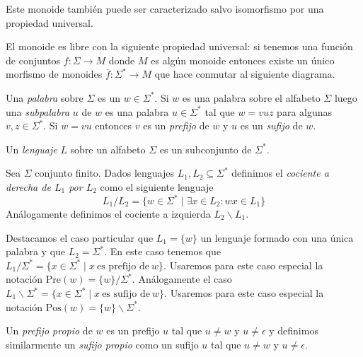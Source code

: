 \documentclass[tesis.tex]{subfiles}
\begin{document}
Este monoide también puede ser caracterizado salvo isomorfismo por una propiedad universal.

\begin{obs}
	El monoide es libre con la siguiente propiedad universal: si tenemos una función de conjuntos $f: \Sigma \to M$ donde $M$ es algún monoide entonces existe un único morfismo de monoides $\overline f: \Sigma^{*} \to M$ que hace conmutar al siguiente diagrama.	
	
	\begin{center}
	\end{center}
	
\end{obs}

Una \emph{palabra} sobre $\Sigma$ es un $w \in \Sigma^*$.
Si $w $ es una palabra sobre el alfabeto $\Sigma$ luego una \emph{subpalabra} $u$ de $w$ es una palabra $u \in \Sigma^*$ tal que $w = vuz$ para algunas $v, z \in \Sigma^*$. 
Si $w = vu$ entonces $v$ es un \emph{prefijo} de $w$ y $u$ es un \emph{sufijo} de $w$.


\begin{deff}
	Un \emph{lenguaje} $L$ sobre un alfabeto $\Sigma$ es un subconjunto de $\Sigma^*$.
\end{deff}

\begin{deff}
	Sea $\Sigma$ conjunto finito.
	Dados lenguajes $L_{1}, L_{2} \subseteq \Sigma^*$ definimos el \emph{cociente a derecha de $L_{1}$ por $L_{2}$} como el siguiente lenguaje
	\[
	L_{1}/L_{2} = \{ w \in \Sigma^* \mid \exists x \in L_{2}: wx \in L_{1}    \}
	\]
	Análogamente definimos el cociente a izquierda $L_{2} \backslash L_{1}$.
\end{deff}
Destacamos el caso particular que $L_{1} = \{w\}$ un lenguaje formado con una única palabra y que $L_{2} = \Sigma^*$.
En este caso tenemos que $L_{1}/\Sigma^* = \{  x \in \Sigma^*  \mid x \ \text{es prefijo de} \ w  \}$.
Usaremos para este caso especial la notación $ \textrm{Pre}(w) = \{w\}/\Sigma^*$.
Análogamente el caso $L_{1} \backslash \Sigma^{*} = \{  x \in \Sigma^*  \mid x \ \text{es sufijo de} \ w  \}$.
Usaremos para este caso especial la notación $ \textrm{Pos}(w) = \{w\} \backslash \Sigma^*$.


Un \emph{prefijo propio} de $w$ es un prefijo $u$ tal que $u \neq w$ y $u \neq \epsilon$ y definimos similarmente un \emph{sufijo propio} como un sufijo $u$ tal que $u \neq w$ y $u \neq \epsilon$.
\end{document}
